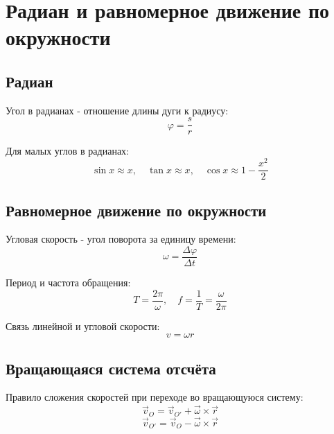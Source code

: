 \documentclass{article}
\begin{document}
\section*{Радиан и равномерное движение по окружности}

\subsection*{Радиан}
Угол в радианах - отношение длины дуги к радиусу:
\[\varphi = \frac{s}{r}\]

Для малых углов в радианах:
\[\sin x \approx x, \quad \tan x \approx x, \quad \cos x \approx 1 - \frac{x^2}{2}\]

\subsection*{Равномерное движение по окружности}
Угловая скорость - угол поворота за единицу времени:
\[\omega = \frac{\Delta\varphi}{\Delta t}\]

Период и частота обращения:
\[T = \frac{2\pi}{\omega}, \quad f = \frac{1}{T} = \frac{\omega}{2\pi}\]

Связь линейной и угловой скорости:
\[v = \omega r\]

\subsection*{Вращающаяся система отсчёта}
Правило сложения скоростей при переходе во вращающуюся систему:
\[\vec v_O = \vec v_{O'} + \vec\omega \times \vec r\]
\[\vec v_{O'} = \vec v_O - \vec\omega \times \vec r\]
\end{document}
